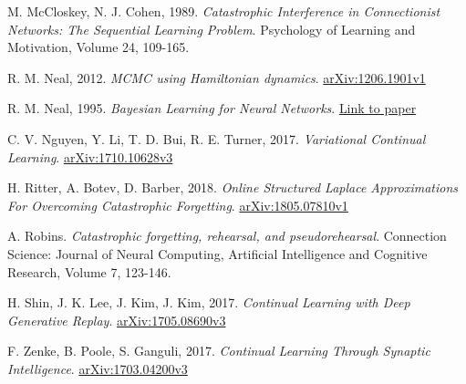 \documentclass[a4paper,11=0pt]{article}
\begin{document}
\begin{thebibliography}{8}
 M. McCloskey, N. J. Cohen, 1989. \textit{Catastrophic Interference in Connectionist Networks: The Sequential Learning Problem}. Psychology of Learning and Motivation, Volume 24, 109-165.

 R. M. Neal, 2012. \textit{MCMC using Hamiltonian dynamics}. \href{https://arxiv.org/abs/1206.1901}{arXiv:1206.1901v1}

 R. M. Neal, 1995. \textit{Bayesian Learning for Neural Networks}. \href{http://citeseerx.ist.psu.edu/viewdoc/download?doi=10.1.1.446.9306&rep=rep1&type=pdf}{Link to paper}

 C. V. Nguyen, Y. Li, T. D. Bui, R. E. Turner, 2017. \textit{Variational Continual Learning}. \href{https://arxiv.org/abs/1710.10628}{arXiv:1710.10628v3}


 H. Ritter, A. Botev, D. Barber, 2018. \textit{Online Structured Laplace Approximations For Overcoming Catastrophic Forgetting}. \href{https://arxiv.org/abs/1805.07810}{arXiv:1805.07810v1}

 A. Robins. \textit{Catastrophic forgetting, rehearsal, and pseudorehearsal}. Connection Science: Journal of Neural Computing, Artificial Intelligence and Cognitive Research, Volume 7, 123-146.

 H. Shin, J. K. Lee, J. Kim, J. Kim, 2017. \textit{Continual Learning with Deep Generative Replay}. \href{https://arxiv.org/abs/1705.08690}{arXiv:1705.08690v3}

 F. Zenke, B. Poole, S. Ganguli, 2017. \textit{Continual Learning Through Synaptic Intelligence}. \href{https://arxiv.org/abs/1703.04200}{arXiv:1703.04200v3}




\end{thebibliography}
\end{document}
